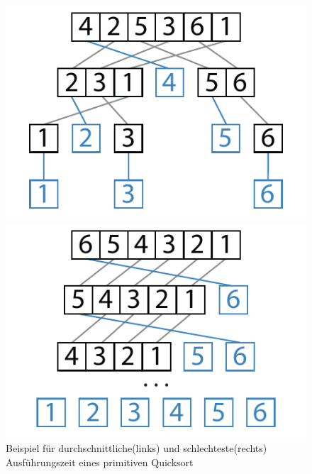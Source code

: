 \begin{figure}[h]
	\centering
	\begin{minipage}{.45\textwidth}
		\centering
		\includegraphics[width=\textwidth]{Graphics/Quicksort_example_avg}
	\end{minipage}
	\begin{minipage}{.45\textwidth}
		\centering
		\includegraphics[width=\textwidth]{Graphics/Quicksort_example_wcet}
	\end{minipage}
	\caption{Beispiel für durchschnittliche(links) und schlechteste(rechts) Ausführungszeit eines primitiven Quicksort}
	\label{fig:quicksort_example}
\end{figure}

